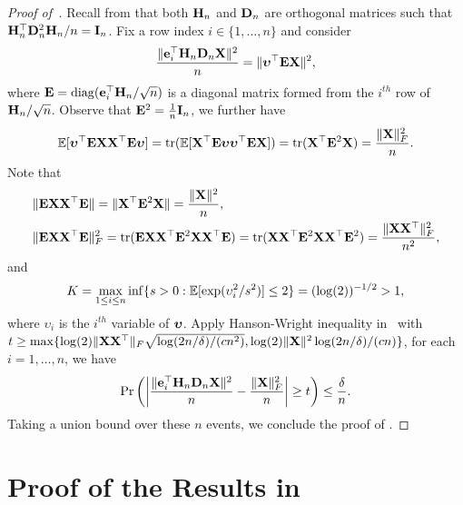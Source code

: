 \documentclass[11pt,a4paper]{article}
\begin{document}
\begin{proof}[Proof of~]
Recall from  that both $\mathbf{H}_n$ and $\mathbf{D}_n$ are orthogonal matrices such that $\mathbf{H}_n^\top \mathbf{D}_n^2\mathbf{H}_n/n=\mathbf{I}_n$.  
Fix a row index $i \in\{1,\ldots,n\}$ and consider
\begin{align*}
  \frac{\|\mathbf{e}_i^\top\mathbf{H}_n\mathbf{D}_n\mathbf{X}\|^2}{n}=\|\boldsymbol{\upsilon}^\top\mathbf{E}\mathbf{X}\|^2,
\end{align*}
where  $\mathbf{E}=\operatorname{diag}(\mathbf{e}_i^\top\mathbf{H}_n/\sqrt{n})$ is a diagonal matrix formed from the $i^{th}$ row of $\mathbf{H}_n/\sqrt{n}$.  
Observe that $\mathbf{E}^2=\frac{1}{n}\mathbf{I}_n$, we further have
\begin{align*}  
    {\mathbb{E}}[\boldsymbol{\upsilon}^{\top}\mathbf{E}\mathbf{X}\mathbf{X}^\top\mathbf{E}\boldsymbol{\upsilon}]=\operatorname{tr}({\mathbb{E}}[\mathbf{X}^\top\mathbf{E}\boldsymbol{\upsilon}\boldsymbol{\upsilon}^{\top}\mathbf{E}\mathbf{X}])=\operatorname{tr}(\mathbf{X}^\top\mathbf{E}^2\mathbf{X})=\frac{\|\mathbf{X}\|^2_F}{n}.
\end{align*}
Note that 
\begin{align*}
& \|\mathbf{E}\mathbf{X}\mathbf{X}^\top\mathbf{E}\|=\|\mathbf{X}^\top\mathbf{E}^2\mathbf{X}\|=\frac{\|\mathbf{X}\|^2}{n},\\
 &\|\mathbf{E}\mathbf{X}\mathbf{X}^\top\mathbf{E}\|^2_F=\operatorname{tr}(\mathbf{E}\mathbf{X}\mathbf{X}^\top\mathbf{E}^2\mathbf{X}\mathbf{X}^\top\mathbf{E})=\operatorname{tr}(\mathbf{X}\mathbf{X}^\top\mathbf{E}^2\mathbf{X}\mathbf{X}^\top\mathbf{E}^2)=\frac{\|\mathbf{X}\mathbf{X}^\top\|^2_F}{n^2},
\end{align*}
and 
\begin{equation*}
    K= \max\limits_{1 \leq i \leq n} \inf \{s > 0 : {\mathbb{E}}[\exp(\upsilon_i^2 / s ^2) ]\leq 2\}=(\log (2))^{-1/2}>1,
\end{equation*}
where $\upsilon_i$ is the $i^{th}$ variable of $\boldsymbol{\upsilon}$.
Apply Hanson-Wright inequality in~ with $ t\geq \max\{\log(2)\|\mathbf{X}\mathbf{X}^\top\|_F\sqrt{\log(2n/\delta)/(cn^2)},\log(2)\|\mathbf{X}\|^2\log(2n/\delta)/(cn)\}$,
 for each $i=1,\ldots,n$, we have 
\begin{align*}
    \Pr\left(\left|\frac{\|\mathbf{e}_i^\top\mathbf{H}_n\mathbf{D}_n\mathbf{X}\|^2}{n}-\frac{\|\mathbf{X}\|_F^2}{n} \right|   \geq t \right)\leq \frac{\delta}{n}.
\end{align*}
Taking a union bound over these $n$ events, we conclude the proof of .
\end{proof}


\section{Proof of the Results in }\label{sec:proof_application}
\end{document}
